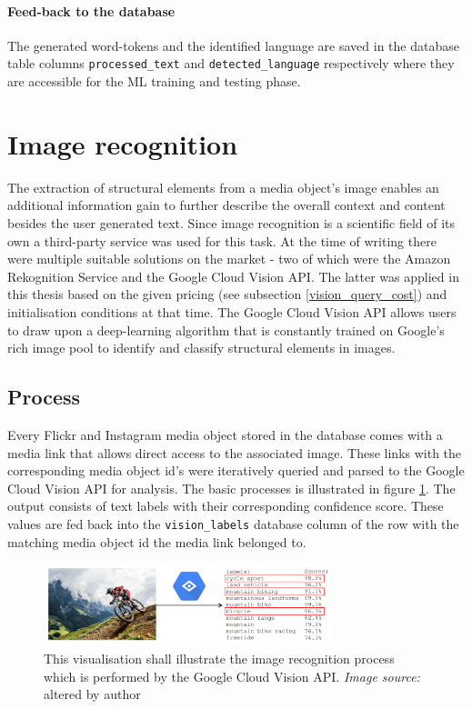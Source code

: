 \paragraph*{Feed-back to the database}
The generated word-tokens and the identified language are saved in the database table columns \texttt{processed\_text} and \texttt{detected\_language} respectively where they are accessible for the ML training and testing phase.

\section{Image recognition} \label{image_recognition}
The extraction of structural elements from a media object's image enables an additional information gain to further describe the overall context and content besides the user generated text. Since image recognition is a scientific field of its own a third-party service was used for this task. At the time of writing there were multiple suitable solutions on the market - two of which were the Amazon Rekognition Service and the Google Cloud Vision API. The latter was applied in this thesis based on the given pricing (see subsection \ref{vision_query_cost}) and initialisation conditions at that time. The Google Cloud Vision API allows users to draw upon a deep-learning algorithm that is constantly trained on Google's rich image pool to identify and classify structural elements in images.

\subsection{Process}
Every Flickr and Instagram media object stored in the database comes with a media link that allows direct access to the associated image. These links with the corresponding media object id's were iteratively queried and parsed to the Google Cloud Vision API for analysis. The basic processes is illustrated in figure \ref{fig:vision_illustration}. The output consists of text labels with their corresponding confidence score. These values are fed back into the \texttt{vision\_labels} database column of the row with the matching media object id the media link belonged to.

\begin{figure}[h]
   \centering
   \includegraphics[width=0.75\textwidth]{img/vision_illustration}
   \caption{This visualisation shall illustrate the image recognition process which is performed by the Google Cloud Vision API. \textit{Image source:} \parencite{Allaboutlimassol2015} altered by author}
   \label{fig:vision_illustration}
\end{figure}

